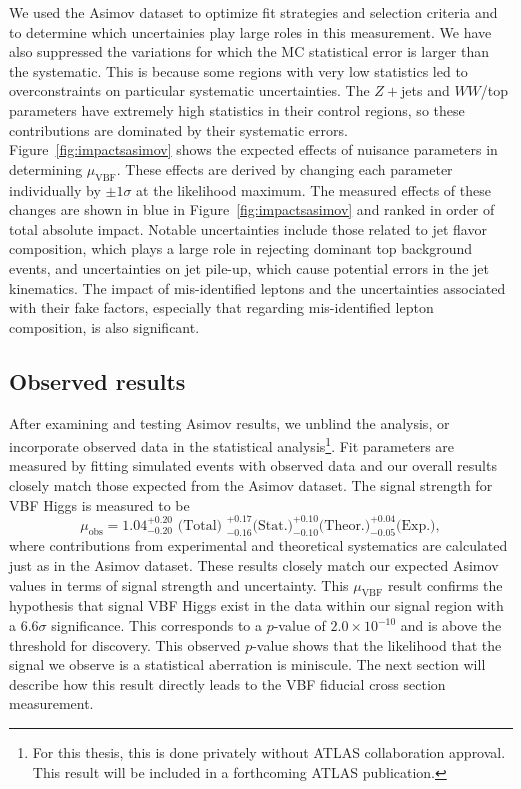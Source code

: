 We used the Asimov dataset to optimize fit strategies and selection criteria and to determine which uncertainies play large roles in this measurement. We have also suppressed the variations for which the MC statistical error is larger than the systematic. This is because some regions with very low statistics led to overconstraints on particular systematic uncertainties. The $Z+$jets and $WW$/top parameters have extremely high statistics in their control regions, so these contributions are dominated by their systematic errors. Figure~\ref{fig:impactsasimov} shows the expected effects of nuisance parameters in determining $\mu_{\text{VBF}}$. These effects are derived by changing each parameter individually by $\pm 1\sigma$ at the likelihood maximum. The measured effects of these changes are shown in blue in Figure~\ref{fig:impactsasimov} and ranked in order of total absolute impact. Notable uncertainties include those related to jet flavor composition, which plays a large role in rejecting dominant top background events, and uncertainties on jet pile-up, which cause potential errors in the jet kinematics. The impact of mis-identified leptons and the uncertainties associated with their fake factors, especially that regarding mis-identified lepton composition, is also significant.

\subsection{Observed results}
After examining and testing Asimov results, we unblind the analysis, or incorporate observed data in the statistical analysis\footnote{For this thesis, this is done privately without ATLAS collaboration approval. This result will be included in a forthcoming ATLAS publication.}. Fit parameters are measured by fitting simulated events with observed data and our overall results closely match those expected from the Asimov dataset. The signal strength for VBF Higgs is measured to be
\begin{equation}
\mu_{\text{obs}} = 1.04 ^{+0.20}_{-0.20} \text{ (Total) } ^{+0.17}_{-0.16} \text{(Stat.)} ^{+0.10}_{-0.10} \text{(Theor.)} ^{+0.04}_{-0.05} \text{(Exp.)},
\end{equation}
where contributions from experimental and theoretical systematics are  calculated just as in the Asimov dataset. These results closely match our expected Asimov values in terms of signal strength and uncertainty. This $\mu_\text{VBF}$ result confirms the hypothesis that signal VBF Higgs exist in the data within our signal region with a 6.6$\sigma$ significance. This corresponds to a $p$-value of $2.0\times10^{-10}$ and is above the threshold for discovery. This observed $p$-value shows that the likelihood that the signal we observe is a statistical aberration is miniscule. The next section will describe how this result directly leads to the VBF fiducial cross section measurement. 

